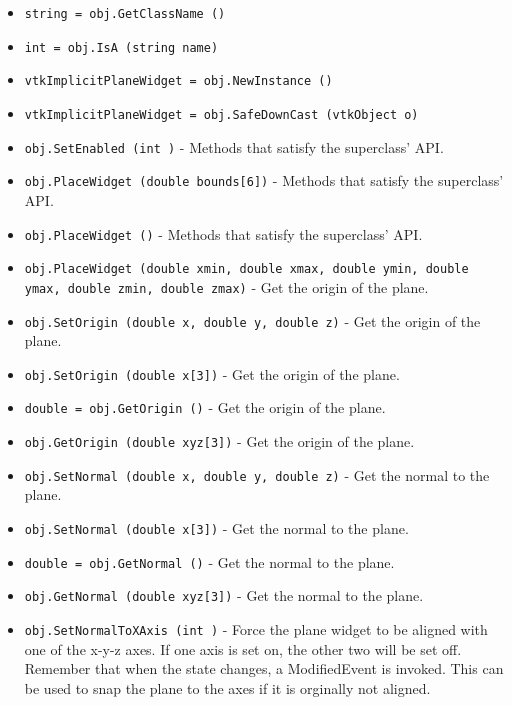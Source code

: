 \begin{itemize}
\item  \verb|string = obj.GetClassName ()|

\item  \verb|int = obj.IsA (string name)|

\item  \verb|vtkImplicitPlaneWidget = obj.NewInstance ()|

\item  \verb|vtkImplicitPlaneWidget = obj.SafeDownCast (vtkObject o)|

\item  \verb|obj.SetEnabled (int )| -  Methods that satisfy the superclass' API.

\item  \verb|obj.PlaceWidget (double bounds[6])| -  Methods that satisfy the superclass' API.

\item  \verb|obj.PlaceWidget ()| -  Methods that satisfy the superclass' API.

\item  \verb|obj.PlaceWidget (double xmin, double xmax, double ymin, double ymax, double zmin, double zmax)| -  Get the origin of the plane.

\item  \verb|obj.SetOrigin (double x, double y, double z)| -  Get the origin of the plane.

\item  \verb|obj.SetOrigin (double x[3])| -  Get the origin of the plane.

\item  \verb|double = obj.GetOrigin ()| -  Get the origin of the plane.

\item  \verb|obj.GetOrigin (double xyz[3])| -  Get the origin of the plane.

\item  \verb|obj.SetNormal (double x, double y, double z)| -  Get the normal to the plane.

\item  \verb|obj.SetNormal (double x[3])| -  Get the normal to the plane.

\item  \verb|double = obj.GetNormal ()| -  Get the normal to the plane.

\item  \verb|obj.GetNormal (double xyz[3])| -  Get the normal to the plane.

\item  \verb|obj.SetNormalToXAxis (int )| -  Force the plane widget to be aligned with one of the x-y-z axes.
 If one axis is set on, the other two will be set off.
 Remember that when the state changes, a ModifiedEvent is invoked.
 This can be used to snap the plane to the axes if it is orginally
 not aligned.


\end{itemize}
